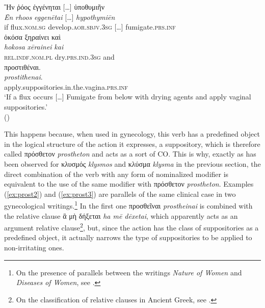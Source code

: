 \documentclass[output=paper,colorlinks,citecolor=brown]{langscibook}
\begin{document}
\begin{exe}
\ex\label{ex:prost1}
\glll Ἢν ῥόος ἐγγένηται […] ὑποθυμιῆν  \\ 
\textit{Ēn} \textit{rhoos} \textit{eggenētai} […] \textit{hypothymiēn}  \\
if flux.\textsc{nom.sg} develop.\textsc{aor.sbjv.3sg} […] fumigate.\textsc{prs.inf}  \\

\glll ὁκόσα ξηραίνει καὶ  \\
\textit{hokosa} \textit{xērainei} \textit{kai}  \\
\textsc{rel.indf.nom.pl} dry.\textsc{prs.ind.3sg} and  \\

\glll προστιθέναι. \\
\textit{prostithenai}. \\
apply.suppositories.in.the.vagina.\textsc{prs.inf} \\
\glt ‘If a flux occurs […] Fumigate from below with drying agents and apply vaginal suppositories.' \\
\hspace*{\fill}()
\end{exe}

This happens because, when used in gynecology, this verb has a predefined object in the logical structure of the action it expresses, a suppository, which is therefore called πρόσθετον \textit{prostheton} and acts as a sort of CO. This is why, exactly as has been observed for κλυσμός \textit{klysmos} and κλύσμα \textit{klysma} in the previous section, the direct combination of the verb with any form of nominalized modifier is equivalent to the use of the same modifier with πρόσθετον \textit{prostheton}. Examples (\ref{ex:prost2}) and (\ref{ex:prost3}) are parallels of the same clinical case in two gynecological writings.\footnote{On the presence of parallels between the writings \textit{Nature of Women} and \textit{Diseases of Women}, see \citet[xii–xvi]{Bourbon2008}.} In the first one προσθεῖναι \textit{prostheinai} is combined with the relative clause ἃ μὴ δήξεται \textit{ha mē dēxetai}, which apparently acts as an argument relative clause\footnote{On the classification of relative clauses in Ancient Greek, see \citet*[378--379]{CrespoContiMaquieira2003}.}, but, since the action has the class of suppositories as a predefined object, it actually narrows the type of suppositories to be applied to non-irritating ones.
\end{document}
